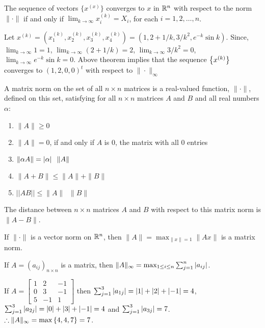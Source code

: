 \documentclass[../main-sheet.tex]{subfiles}
\begin{document}
\begin{thm}
    The sequence of vectors \(\{x^{(x)}\}\) converges to \(x\) in \(\mathbb{R}^n\) with respect to the norm \(\|\cdot\|\) if and only if \(\lim_{k\to\infty}x_i^{(k)} = X_i\), for each \(i = 1,2,\dots,n\).
\end{thm}
\begin{ex}
    Let \(x^{(k)}=\left( x_1^{(k)},x_2^{(k)},x_3^{(k)},x_4^{(k)} \right)=(1,2+1/k,3/k^2,e^{-k}\sin k)\). Since, \(\lim_{k\to \infty}1=1\), \(\lim_{k\to \infty} (2+1/k)=2\), \(\lim_{k\to \infty} 3/k^2=0\), \(\lim_{k\to \infty}e^{-k}\sin k=0\). Above theorem implies that the sequence \(\left\{x^{(k)}\right\}\) converges to \((1,2,0,0)^t\) with respect to \(\|\cdot \|_\infty\)
\end{ex}
\begin{defn}
    A matrix norm on the set of all \(n \times n\) matrices is a real-valued function, \(\|\cdot\|\), defined on this set, satisfying for all \(n \times n\) matrices \(A\) and \(B\) and all real numbers \(\alpha\):
    \begin{enumerate}[label=(\roman*)]
        \item \(\|A\|\geq 0\)
        \item \(\| A \| = 0\), if and only if \(A\) is 0, the matrix with all 0 entries
        \item \(\|\alpha A\|=\left\vert\alpha\right\vert\;\;\|A\|\)
        \item \(\|A + B\|\leq \|A\| + \|B\|\)
        \item \(||AB||\leq \|A\|\;\;\|B\|\)
    \end{enumerate}
\end{defn}


    The distance between \(n \times n\) matrices \(A\) and \(B\) with respect to this matrix norm is \(\|A-B\|\).
\begin{thm}
    If \(\|\cdot\|\) is a vector norm on \(\mathbb{R}^n\), then \(\|A\|=\max_{\|x\|=1}\|Ax\|\) is a matrix norm.
\end{thm}
\begin{thm}
    If \(A=(a_{ij})_{n\times n}\) is a matrix, then \(\|A\|_\infty=\max_{1\leq i\leq n} \sum_{j=1}^n \left\vert a_{ij}\right\vert\).
\end{thm}
\begin{ex}
    If \(A=\begin{bmatrix}
        1 & 2 & -1\\
        0 & 3 & -1\\
        5 & -1 & 1
    \end{bmatrix}\) then \(\sum_{j=1}^3\left\vert a_{1j}\right\vert=\left\vert1\right\vert+\left\vert2\right\vert+\left\vert-1\right\vert=4\), \(\sum_{j=1}^3\left\vert a_{2j}\right\vert=\left\vert0\right\vert+\left\vert3\right\vert+\left\vert-1\right\vert=4\) and \(\sum_{j=1}^3\left\vert a_{3j}\right\vert=7\).\\
    \(\therefore \|A\|_{\infty}=\max \left\{4,4,7\right\}=7\).
\end{ex}
\end{document}
